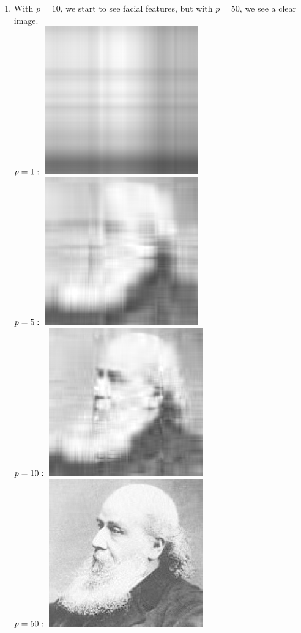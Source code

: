 \documentclass{article}
\begin{document}
\begin{enumerate}
\item With $p=10$, we start to see facial features, but with $p=50$, we see a clear image. \\
$p=1: \\$
\includegraphics[scale=0.4]{testimage-1}\\
$p=5: \\$
\includegraphics[scale=0.4]{testimage-5}\\
$p=10: \\$
\includegraphics[scale=0.4]{testimage-10}\\
$p=50: \\$
\includegraphics[scale=0.4]{testimage-50}\\

\end{enumerate}
\end{document}
